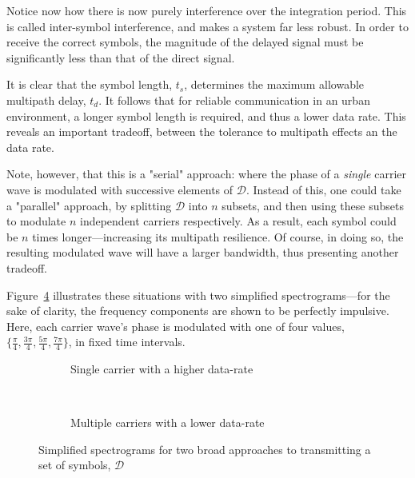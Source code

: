 \documentclass[class=report,11pt,crop=false]{standalone}
\begin{document}
\begin{figure}[htbp]
    \centering
    \def\svgwidth{\linewidth}
    { %
        }
    \caption{}
    \label{fig:multipath-symbol-morethan}
\end{figure}

Notice now how there is now purely interference over the integration period. This is called inter-symbol interference, and makes a system far less robust. In order to receive the correct symbols, the magnitude of the delayed signal must be significantly less than that of the direct signal.

It is clear that the symbol length, \(t_s\), determines the maximum allowable multipath delay, \(t_d\). It follows that for reliable communication in an urban environment, a longer symbol length is required, and thus a lower data rate. This reveals an important tradeoff, between the tolerance to multipath effects an the data rate.

Note, however, that this is a "serial" approach: where the phase of a \emph{single} carrier wave is modulated with successive elements of \(\mathcal{D}\). Instead of this, one could take a "parallel" approach, by splitting \(\mathcal{D}\) into \(n\) subsets, and then using these subsets to modulate \(n\) independent carriers respectively. As a result, each symbol could be \(n\) times longer---increasing its multipath resilience. Of course, in doing so, the resulting modulated wave will have a larger bandwidth, thus presenting another tradeoff.

Figure~\ref{fig:carrier-illustration} illustrates these situations with two simplified spectrograms---for the sake of clarity, the frequency components are shown to be perfectly impulsive. Here, each carrier wave's phase is modulated with one of four values, \(\big\{\frac{\pi}{4}, \frac{3\pi}{4}, \frac{5\pi}{4}, \frac{7\pi}{4}\big\}\), in fixed time intervals.

\begin{figure}[htbp]
    \centering
    \begin{subfigure}[t]{0.48\textwidth}
        \centering
        \def\svgwidth{0.9\linewidth}
        { %
            }
        \caption{Single carrier with a higher data-rate}
        \label{fig:serial-carrier}
    \end{subfigure}%
    ~ 
    \begin{subfigure}[t]{0.48\textwidth}
        \def\svgwidth{0.9\linewidth}
        { %
            }
        \caption{Multiple carriers with a lower data-rate}
        \label{fig:parallel-carrier}
    \end{subfigure}
    \caption{Simplified spectrograms for two broad approaches to transmitting a set of symbols, \(\mathcal{D}\)}
    \label{fig:carrier-illustration}
\end{figure}
\end{document}
